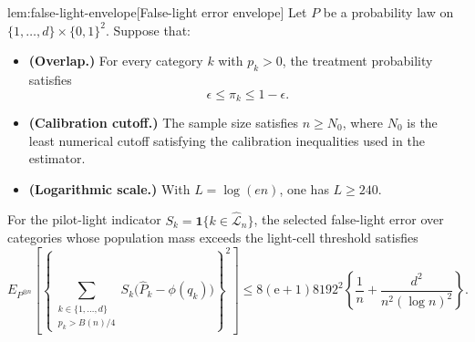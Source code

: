\documentclass[11pt]{article}
\begin{document}
\begin{lemmav}{lem:false-light-envelope}[False-light error envelope]
Let \(P\) be a probability law on \(\{1,\ldots,d\}\times\{0,1\}^2\). Suppose that:
\begin{itemize}
\item \textbf{(Overlap.)} For every category \(k\) with \(p_k>0\), the treatment probability satisfies
\[
\epsilon \le \pi_k \le 1-\epsilon .
\]
\item \textbf{(Calibration cutoff.)} The sample size satisfies \(n\ge N_0\), where \(N_0\) is the least numerical cutoff satisfying the calibration inequalities used in the estimator.
\item \textbf{(Logarithmic scale.)} With \(L=\log(en)\), one has \(L\ge 240\).
\end{itemize}
For the pilot-light indicator \(S_k=\mathbf 1\{k\in\widehat{\mathcal L}_n\}\), the selected false-light error over categories whose population mass exceeds the light-cell threshold satisfies
\[
E_{P^{\otimes n}}\left[
\left\{
\sum_{\substack{k\in\{1,\ldots,d\}\\ p_k>B(n)/4}}
S_k\bigl(\widehat P_k-\phi(q_k)\bigr)
\right\}^2
\right]
\le
8(\mathrm e+1)8192^2
\left\{
\frac1n+\frac{d^2}{n^2(\log n)^2}
\right\}.
\]
\end{lemmav}
\end{document}
